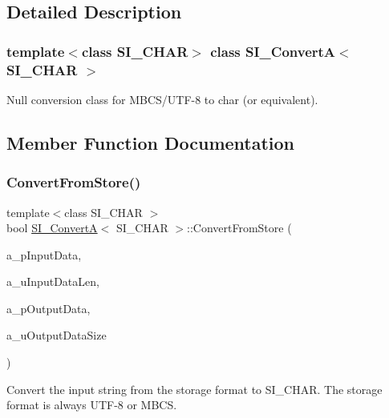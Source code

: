 \subsection{Detailed Description}
\subsubsection*{template$<$class S\+I\+\_\+\+C\+H\+AR$>$\newline
class S\+I\+\_\+\+Convert\+A$<$ S\+I\+\_\+\+C\+H\+A\+R $>$}

Null conversion class for M\+B\+C\+S/\+U\+T\+F-\/8 to char (or equivalent). 

\subsection{Member Function Documentation}
\mbox{\label{a01888_a5176a6dc2dc6482280e9a08dd3607f9e}} 
\subsubsection{\texorpdfstring{Convert\+From\+Store()}{ConvertFromStore()}}
{\footnotesize\ttfamily template$<$class S\+I\+\_\+\+C\+H\+AR $>$ \\
bool \hyperlink{a01888}{S\+I\+\_\+\+ConvertA}$<$ S\+I\+\_\+\+C\+H\+AR $>$\+::Convert\+From\+Store (\begin{DoxyParamCaption}\item[{const char $\ast$}]{a\+\_\+p\+Input\+Data,  }\item[{size\+\_\+t}]{a\+\_\+u\+Input\+Data\+Len,  }\item[{S\+I\+\_\+\+C\+H\+AR $\ast$}]{a\+\_\+p\+Output\+Data,  }\item[{size\+\_\+t}]{a\+\_\+u\+Output\+Data\+Size }\end{DoxyParamCaption})\hspace{0.3cm}{\ttfamily [inline]}}

Convert the input string from the storage format to S\+I\+\_\+\+C\+H\+AR. The storage format is always U\+T\+F-\/8 or M\+B\+CS.


